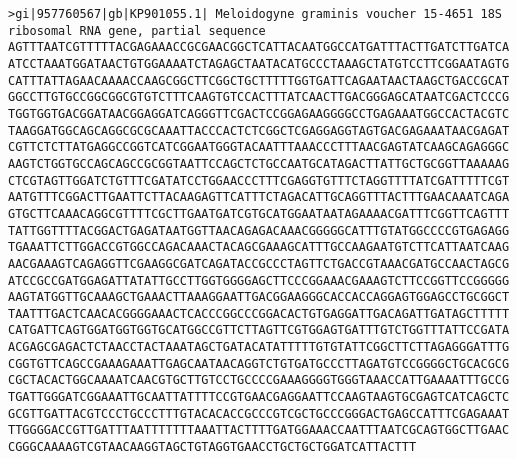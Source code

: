 \documentclass[11pt]{article}
\begin{document}
\begin{Verbatim}[commandchars=\\\{\}]
>gi|957760567|gb|KP901055.1| Meloidogyne graminis voucher 15-4651 18S ribosomal RNA gene, partial sequence
AGTTTAATCGTTTTTACGAGAAACCGCGAACGGCTCATTACAATGGCCATGATTTACTTGATCTTGATCA
ATCCTAAATGGATAACTGTGGAAAATCTAGAGCTAATACATGCCCTAAAGCTATGTCCTTCGGAATAGTG
CATTTATTAGAACAAAACCAAGCGGCTTCGGCTGCTTTTTGGTGATTCAGAATAACTAAGCTGACCGCAT
GGCCTTGTGCCGGCGGCGTGTCTTTCAAGTGTCCACTTTATCAACTTGACGGGAGCATAATCGACTCCCG
TGGTGGTGACGGATAACGGAGGATCAGGGTTCGACTCCGGAGAAGGGGCCTGAGAAATGGCCACTACGTC
TAAGGATGGCAGCAGGCGCGCAAATTACCCACTCTCGGCTCGAGGAGGTAGTGACGAGAAATAACGAGAT
CGTTCTCTTATGAGGCCGGTCATCGGAATGGGTACAATTTAAACCCTTTAACGAGTATCAAGCAGAGGGC
AAGTCTGGTGCCAGCAGCCGCGGTAATTCCAGCTCTGCCAATGCATAGACTTATTGCTGCGGTTAAAAAG
CTCGTAGTTGGATCTGTTTCGATATCCTGGAACCCTTTCGAGGTGTTTCTAGGTTTTATCGATTTTTCGT
AATGTTTCGGACTTGAATTCTTACAAGAGTTCATTTCTAGACATTGCAGGTTTACTTTGAACAAATCAGA
GTGCTTCAAACAGGCGTTTTCGCTTGAATGATCGTGCATGGAATAATAGAAAACGATTTCGGTTCAGTTT
TATTGGTTTTACGGACTGAGATAATGGTTAACAGAGACAAACGGGGGCATTTGTATGGCCCCGTGAGAGG
TGAAATTCTTGGACCGTGGCCAGACAAACTACAGCGAAAGCATTTGCCAAGAATGTCTTCATTAATCAAG
AACGAAAGTCAGAGGTTCGAAGGCGATCAGATACCGCCCTAGTTCTGACCGTAAACGATGCCAACTAGCG
ATCCGCCGATGGAGATTATATTGCCTTGGTGGGGAGCTTCCCGGAAACGAAAGTCTTCCGGTTCCGGGGG
AAGTATGGTTGCAAAGCTGAAACTTAAAGGAATTGACGGAAGGGCACCACCAGGAGTGGAGCCTGCGGCT
TAATTTGACTCAACACGGGGAAACTCACCCGGCCCGGACACTGTGAGGATTGACAGATTGATAGCTTTTT
CATGATTCAGTGGATGGTGGTGCATGGCCGTTCTTAGTTCGTGGAGTGATTTGTCTGGTTTATTCCGATA
ACGAGCGAGACTCTAACCTACTAAATAGCTGATACATATTTTTGTGTATTCGGCTTCTTAGAGGGATTTG
CGGTGTTCAGCCGAAAGAAATTGAGCAATAACAGGTCTGTGATGCCCTTAGATGTCCGGGGCTGCACGCG
CGCTACACTGGCAAAATCAACGTGCTTGTCCTGCCCCGAAAGGGGTGGGTAAACCATTGAAAATTTGCCG
TGATTGGGATCGGAAATTGCAATTATTTTCCGTGAACGAGGAATTCCAAGTAAGTGCGAGTCATCAGCTC
GCGTTGATTACGTCCCTGCCCTTTGTACACACCGCCCGTCGCTGCCCGGGACTGAGCCATTTCGAGAAAT
TTGGGGACCGTTGATTTAATTTTTTTAAATTACTTTTGATGGAAACCAATTTAATCGCAGTGGCTTGAAC
CGGGCAAAAGTCGTAACAAGGTAGCTGTAGGTGAACCTGCTGCTGGATCATTACTTT


\end{Verbatim}
\end{document}
